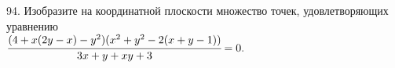 94. Изобразите на координатной плоскости множество точек, удовлетворяющих уравнению \\$\cfrac{(4+x(2y-x)-y^2)(x^2+y^2-2(x+y-1))}{3x+y+xy+3}=0.$\\
